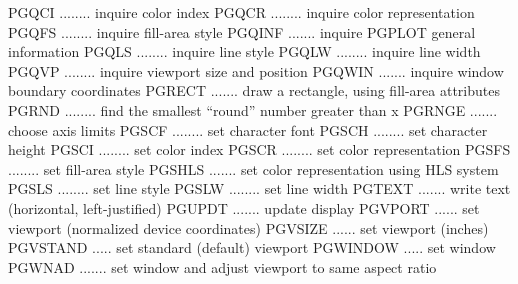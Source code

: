 {\eightpoint\begintt
PGQCI ........ inquire color index
PGQCR ........ inquire color representation
PGQFS ........ inquire fill-area style
PGQINF ....... inquire PGPLOT general information
PGQLS ........ inquire line style
\endtt}
{\eightpoint\begintt
PGQLW ........ inquire line width
PGQVP ........ inquire viewport size and position
PGQWIN ....... inquire window boundary coordinates
PGRECT ....... draw a rectangle, using fill-area attributes
PGRND ........ find the smallest ``round'' number greater than x
\endtt}
{\eightpoint\begintt
PGRNGE ....... choose axis limits
PGSCF ........ set character font
PGSCH ........ set character height
PGSCI ........ set color index
PGSCR ........ set color representation
\endtt}
{\eightpoint\begintt
PGSFS ........ set fill-area style
PGSHLS ....... set color representation using HLS system
PGSLS ........ set line style
PGSLW ........ set line width
PGTEXT ....... write text (horizontal, left-justified)
\endtt}
{\eightpoint\begintt
PGUPDT ....... update display
PGVPORT ...... set viewport (normalized device coordinates)
PGVSIZE ...... set viewport (inches)
PGVSTAND ..... set standard (default) viewport
PGWINDOW ..... set window
\endtt}
{\eightpoint\begintt
PGWNAD ....... set window and adjust viewport to same aspect ratio
\endtt}
